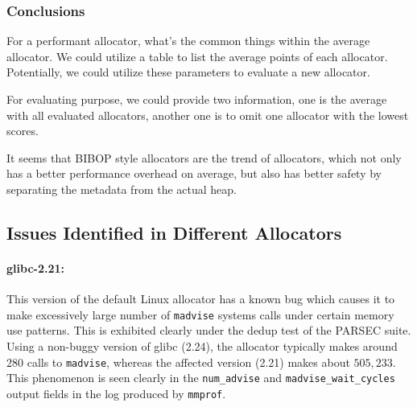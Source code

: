\subsubsection{Conclusions}

For a performant allocator, what's the common things within the average allocator. We could utilize a table to list the average points of each allocator. Potentially, we could utilize these parameters to evaluate a new allocator. 

For evaluating purpose, we could provide two information, one is the average with all evaluated allocators, another one is to omit one allocator with the lowest scores. 


It seems that BIBOP style allocators are the trend of allocators, which not only has a better performance overhead on average, but also has better safety by separating the metadata from the actual heap. 

\subsection{Issues Identified in Different Allocators}

\paragraph{glibc-2.21:}
This version of the default Linux allocator has a known bug which causes it to make excessively large number of \texttt{madvise} systems calls under certain memory use patterns. This is exhibited clearly under the dedup test of the PARSEC suite.
	Using a non-buggy version of glibc (2.24), the allocator typically makes around $280$ calls to \texttt{madvise}, whereas the affected version (2.21) makes about $505,233$.
	This phenomenon is seen clearly in the \texttt{num\_advise} and \texttt{madvise\_wait\_cycles} output fields in the log produced by \texttt{mmprof}.


